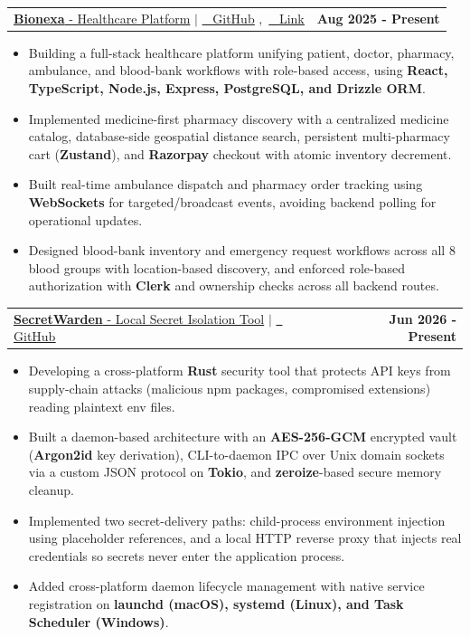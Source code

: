 \documentclass[letterpaper,11pt]{article}
\makeatletter
\newcommand{\resumeItem}[1]{
    \item\small{
            {#1 \vspace{-2pt}}
        }
    }
\newcommand{\resumeProjectHeading}[2]{
    \item
        \begin{tabular*}{1.001\textwidth}{l@{\extracolsep{\fill}}r}
            \small#1 & \textbf{\small #2}\\
        \end{tabular*}\vspace{-7pt}
    }
\newcommand{\resumeItemListStart}{\begin{itemize}}
\newcommand{\resumeItemListEnd}{\end{itemize}\vspace{-5pt}}
\makeatother
\begin{document}
\resumeProjectHeading
{
    \large{\underline{\textbf{Bionexa} - Healthcare Platform}}
    $|$
    \href{https://gitlab.com/legion2004/bionexa}
    {\raisebox{-0.2\height}\ \color{blue} \underline{GitHub}}
    $,$
    \href{https://bionexa.milinda.me}
    {\raisebox{-0.2\height}\ \color{blue} \underline{Link}}
}{Aug 2025 - Present}
\resumeItemListStart
\resumeItem{\normalsize{Building a full-stack healthcare platform unifying patient, doctor, pharmacy, ambulance, and blood-bank workflows with role-based access, using \textbf{React, TypeScript, Node.js, Express, PostgreSQL, and Drizzle ORM}.}}
\resumeItem{\normalsize{Implemented medicine-first pharmacy discovery with a centralized medicine catalog, database-side geospatial distance search, persistent multi-pharmacy cart (\textbf{Zustand}), and \textbf{Razorpay} checkout with atomic inventory decrement.}}
\resumeItem{\normalsize{Built real-time ambulance dispatch and pharmacy order tracking using \textbf{WebSockets} for targeted/broadcast events, avoiding backend polling for operational updates.}}
\resumeItem{\normalsize{Designed blood-bank inventory and emergency request workflows across all 8 blood groups with location-based discovery, and enforced role-based authorization with \textbf{Clerk} and ownership checks across all backend routes.}}
\resumeItemListEnd
\vspace{-15pt}

\resumeProjectHeading
{
    \large{\underline{\textbf{SecretWarden} - Local Secret Isolation Tool}}
    $|$
    \href{https://gitlab.com/legion2004/secretwarden}
    {\raisebox{-0.2\height}\ \color{blue} \underline{GitHub}}
}{Jun 2026 - Present}
\resumeItemListStart
\resumeItem{\normalsize{Developing a cross-platform \textbf{Rust} security tool that protects API keys from supply-chain attacks (malicious npm packages, compromised extensions) reading plaintext env files.}}
\resumeItem{\normalsize{Built a daemon-based architecture with an \textbf{AES-256-GCM} encrypted vault (\textbf{Argon2id} key derivation), CLI-to-daemon IPC over Unix domain sockets via a custom JSON protocol on \textbf{Tokio}, and \textbf{zeroize}-based secure memory cleanup.}}
\resumeItem{\normalsize{Implemented two secret-delivery paths: child-process environment injection using placeholder references, and a local HTTP reverse proxy that injects real credentials so secrets never enter the application process.}}
\resumeItem{\normalsize{Added cross-platform daemon lifecycle management with native service registration on \textbf{launchd (macOS), systemd (Linux), and Task Scheduler (Windows)}.}}
\resumeItemListEnd
\vspace{-15pt}
\end{document}
